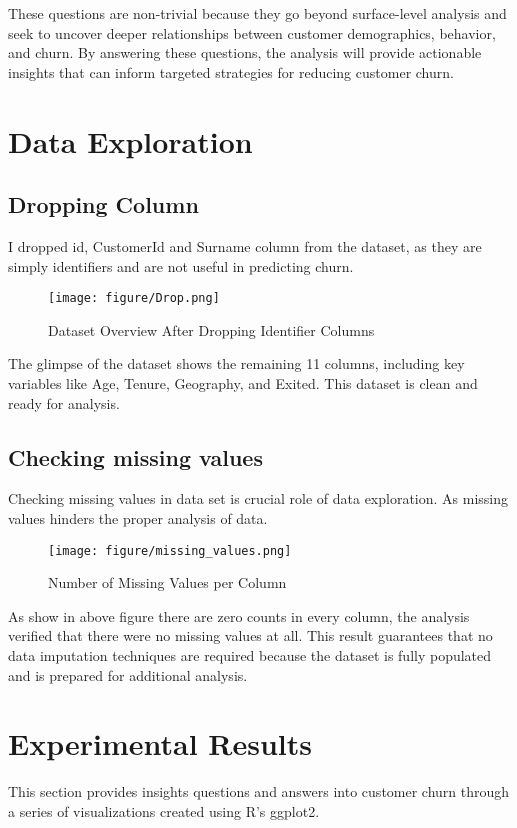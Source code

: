 \documentclass[12pt]{article}
\begin{document}
These questions are non-trivial because they go beyond surface-level analysis and seek to uncover deeper relationships between customer demographics, behavior, and churn. By answering these questions, the analysis will provide actionable insights that can inform targeted strategies for reducing customer churn.

\section{Data Exploration}
\subsection{Dropping Column}
I dropped id, CustomerId and Surname column from the dataset, as they are simply identifiers and are not useful in predicting churn.

\begin{figure}[h]
    \centering
    \texttt{[image: figure/Drop.png]}  
    \caption{Dataset Overview After Dropping Identifier Columns}
        \label{fig:exam}
   \vspace{0.5cm}
\end{figure}

The glimpse of the dataset shows the remaining 11 columns, including key variables like Age, Tenure, Geography, and Exited. This dataset is clean and ready for analysis.


\subsection{Checking missing values}
Checking missing values in data set is crucial role of data exploration. As missing values hinders the proper analysis of data.
\begin{figure}[h]
    \centering
    \texttt{[image: figure/missing\_values.png]}  
    \caption{Number of Missing Values per Column}
        \label{fig:ex}
   \vspace{0.5cm}
\end{figure}

\justifying As show in above figure there are zero counts in every column, the analysis verified that there were no missing values at all. This result guarantees that no data imputation techniques are required because the dataset is fully populated and is prepared for additional analysis.



\section{Experimental Results}
This section provides insights questions and answers into customer churn through a series of visualizations created using R’s ggplot2.
\end{document}

